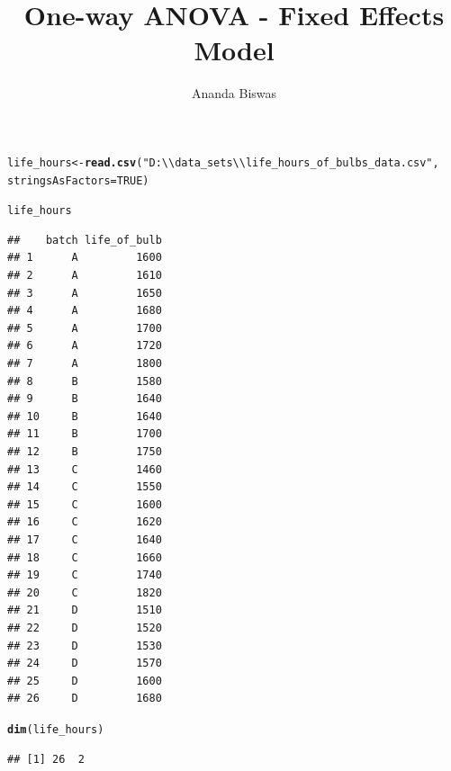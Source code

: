 \documentclass[11pt, a4paper]{article}\usepackage[]{graphicx}\usepackage[]{xcolor}
\title{One-way ANOVA - Fixed Effects Model}
\author{Ananda Biswas}
\date{}
\makeatletter
\newcommand{\hlnum}[1]{\textcolor[rgb]{0.686,0.059,0.569}{#1}}%
\newcommand{\hlstr}[1]{\textcolor[rgb]{0.192,0.494,0.8}{#1}}%
\newcommand{\hlstd}[1]{\textcolor[rgb]{0.345,0.345,0.345}{#1}}%
\newcommand{\hlkwb}[1]{\textcolor[rgb]{0.69,0.353,0.396}{#1}}%
\newcommand{\hlkwc}[1]{\textcolor[rgb]{0.333,0.667,0.333}{#1}}%
\newcommand{\hlkwd}[1]{\textcolor[rgb]{0.737,0.353,0.396}{\textbf{#1}}}%
\newenvironment{kframe}{%
 \def\at@end@of@kframe{}%
 \ifinner\ifhmode%
  \def\at@end@of@kframe{\end{minipage}}%
  \begin{minipage}{\columnwidth}%
 \fi\fi%
 \def\FrameCommand##1{\hskip\@totalleftmargin \hskip-\fboxsep
 \colorbox{shadecolor}{##1}\hskip-\fboxsep
     \hskip-\linewidth \hskip-\@totalleftmargin \hskip\columnwidth}%
 \MakeFramed {\advance\hsize-\width
   \@totalleftmargin\z@ \linewidth\hsize
   \@setminipage}}%
 {\par\unskip\endMakeFramed%
 \at@end@of@kframe}
\newenvironment{knitrout}{}{} %
\makeatother
\begin{document}
\maketitle



\begin{knitrout}
\color{fgcolor}\begin{kframe}
\begin{alltt}
\hlstd{life_hours} \hlkwb{<-} \hlkwd{read.csv}\hlstd{(}\hlstr{"D:\textbackslash{}\textbackslash{}data_sets\textbackslash{}\textbackslash{}life_hours_of_bulbs_data.csv"}\hlstd{,}
    \hlkwc{stringsAsFactors} \hlstd{=} \hlnum{TRUE}\hlstd{)}
\end{alltt}
\end{kframe}
\end{knitrout}

\begin{knitrout}
\color{fgcolor}\begin{kframe}
\begin{alltt}
\hlstd{life_hours}
\end{alltt}
\begin{verbatim}
##    batch life_of_bulb
## 1      A         1600
## 2      A         1610
## 3      A         1650
## 4      A         1680
## 5      A         1700
## 6      A         1720
## 7      A         1800
## 8      B         1580
## 9      B         1640
## 10     B         1640
## 11     B         1700
## 12     B         1750
## 13     C         1460
## 14     C         1550
## 15     C         1600
## 16     C         1620
## 17     C         1640
## 18     C         1660
## 19     C         1740
## 20     C         1820
## 21     D         1510
## 22     D         1520
## 23     D         1530
## 24     D         1570
## 25     D         1600
## 26     D         1680
\end{verbatim}
\end{kframe}
\end{knitrout}

\begin{knitrout}
\color{fgcolor}\begin{kframe}
\begin{alltt}
\hlkwd{dim}\hlstd{(life_hours)}
\end{alltt}
\begin{verbatim}
## [1] 26  2
\end{verbatim}
\end{kframe}
\end{knitrout}
\end{document}

